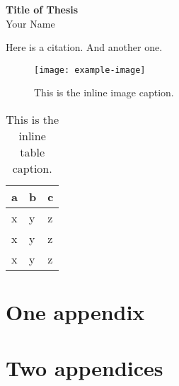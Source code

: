 \documentclass{uscf}
\begin{document}
\clearpage
\begin{centering}
  \textbf{Title of Thesis}\\
  Your Name\\
\end{centering}
\bigskip
\blindtext

\tableofcontents
\listoftables
\listoffigures

\mainmatter

\Blinddocument

\blindtext

Here is a citation\cite{einstein}.
And another one\cite{dirac}.

\blindtext

\begin{figure}\centering
  \texttt{[image: example-image]}
  \caption[This is the index image title.]{This is the inline image caption.}
\end{figure}

\blindtext

\begin{table}\centering
  \begin{tabular}{lll}\toprule
    a & b & c \\\midrule
    x & y & z \\
    x & y & z \\
    x & y & z \\\bottomrule
  \end{tabular}
  \caption[This is the index table title.]{This is the inline table caption.}
\end{table}


\printbibliography[heading=bibintoc]

\appendix

\chapter{One appendix}

\blindtext

\chapter{Two appendices}

\blindtext

\clearpage
\end{document}
